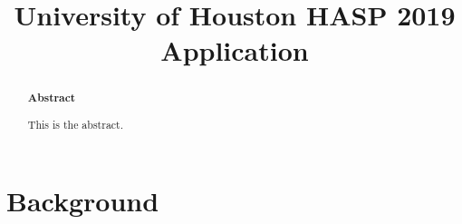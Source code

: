 \documentclass[aps,superscriptaddress,floatfix,nofootinbib,showpacs,amsmath,amssymb,altaffilletter,floatfix,onecolumn]{revtex4-1}
\begin{document}
\title{University of Houston HASP 2019 Application}

\begin{abstract}
  \begin{center}
    {\bf Abstract}
  \end{center}
  
  This is the abstract.
  
  \newpage %
\end{abstract}


\setlength{\parindent}{1em}
\setdefaultleftmargin{1em}{1em}{}{}{}{}
\setcounter{page}{0}\thispagestyle{empty}
\maketitle
\onecolumngrid
\setcounter{tocdepth}{2}
\setcounter{page}{0}\thispagestyle{empty}
\tableofcontents
\setcounter{page}{0}\thispagestyle{empty}
\newpage

	
	\section{Background}
		
		

		
		
		
                
		
		
		









	

\end{document}
